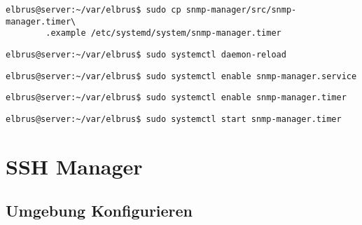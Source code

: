 \documentclass{article}
\begin{document}
	\begin{lstlisting}[caption={Kopieren des Zeitplanungsprogrammes.}]
		elbrus@server:~/var/elbrus$ sudo cp snmp-manager/src/snmp-manager.timer\
		.example /etc/systemd/system/snmp-manager.timer
	\end{lstlisting}
	
	\begin{lstlisting}[caption={Neuladen des 'systemctl' Deamons.}]
		elbrus@server:~/var/elbrus$ sudo systemctl daemon-reload
	\end{lstlisting}
	
	\begin{lstlisting}[caption={Aktivieren des Serviceprogrammes.}]
		elbrus@server:~/var/elbrus$ sudo systemctl enable snmp-manager.service
	\end{lstlisting}
	
	\begin{lstlisting}[caption={Aktivieren des Zeitplanungsprogrammes.}]
		elbrus@server:~/var/elbrus$ sudo systemctl enable snmp-manager.timer
	\end{lstlisting}
	
	\begin{lstlisting}[caption={Starten des Zeitplanungsprogrammes.}]
		elbrus@server:~/var/elbrus$ sudo systemctl start snmp-manager.timer
	\end{lstlisting}
	\newpage
	
	\section{SSH Manager}

	\subsection[file config]{Umgebung Konfigurieren}
	\lstset{style=files}
\end{document}
